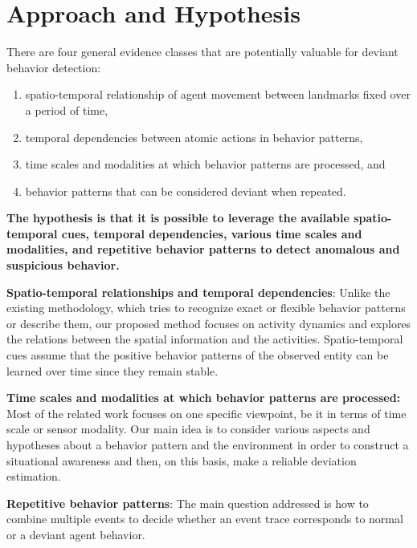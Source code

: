 %
%
\section{Approach and Hypothesis}

There are four general evidence classes that are potentially valuable for deviant behavior detection: 
\begin{enumerate}
	\item spatio-temporal relationship of agent movement between landmarks fixed over a period of time,
	\item temporal dependencies between atomic actions in behavior patterns,
	\item time scales and modalities at which behavior patterns are processed, and
	\item behavior patterns that can be considered deviant when repeated.
\end{enumerate}

\vskip 0.5cm
\textbf{The hypothesis is that it is possible to leverage the available spatio-temporal cues, temporal dependencies, various time scales and modalities, and repetitive behavior patterns to detect anomalous and suspicious behavior.}
\vskip 0.5cm

\vskip 0.2cm
\noindent
\textbf{Spatio-temporal relationships and temporal dependencies}: Unlike the existing methodology, which tries to recognize exact or flexible behavior patterns or describe them, our proposed method focuses on activity dynamics and explores the relations between the spatial information and the activities. Spatio-temporal cues assume that the positive behavior patterns of the observed entity can be learned over time since they remain stable.

\vskip 0.2cm
\noindent
\textbf{Time scales and modalities at which behavior patterns are processed:} Most of the related work focuses on one specific viewpoint, be it in terms of time scale or sensor modality. Our main idea is to consider various aspects and hypotheses about a behavior pattern and the environment in order to construct a situational awareness and then, on this basis, make a reliable deviation estimation.

\vskip 0.2cm
\noindent
\textbf{Repetitive behavior patterns}: The main question addressed is how to combine multiple events to decide whether an event trace corresponds to normal or a deviant agent behavior. %




